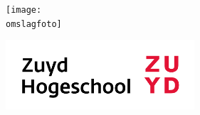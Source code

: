 \begin{titlepage}

\begin{center}


{\makeatletter
    \largetitlestyle\fontsize{64}{94}\selectfont\color{tudelft-cyan}\@title
\makeatother}

{\makeatletter
\ifx\@subtitle\undefined\else
    \bigskip
   {\tudsffamily\fontsize{22}{32}\selectfont\@subtitle}
\fi
\makeatother}

\bigskip
\bigskip

\ifx\@cover\undefined\else
    \begin{figure}[h!]
        \centering
        \texttt{[image: \\omslagfoto]}
    \end{figure}
\fi

\bigskip
\bigskip

{\makeatletter
   {\tudsffamily\fontsize{22}{22}\selectfont{\module}}
\makeatother}

\bigskip
\bigskip


\bigskip
\bigskip

{\makeatletter
    \largetitlestyle\fontsize{12}{12}\selectfont{\studentNames}
\makeatother}

\bigskip

{\makeatletter
   {\tudsffamily\fontsize{10}{10}\selectfont\@date}
\makeatother}

\bigskip
\bigskip

{\makeatletter
    \largetitlestyle\fontsize{18}{18}\selectfont{\organization}
\makeatother}

\bigskip
\bigskip


\bigskip


\begin{figure}[H]
    \centering
    \includegraphics[width=70mm,scale=1.0]{figures/zuyd_logo2.png}
\end{figure}

\end{center}



\end{titlepage}
